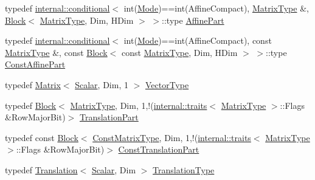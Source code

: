 \begin{DoxyCompactItemize}
\item 
typedef \mbox{\hyperlink{struct_eigen_1_1internal_1_1conditional}{internal\+::conditional}}$<$ int(\mbox{\hyperlink{struct_mode}{Mode}})==int(Affine\+Compact), \mbox{\hyperlink{class_eigen_1_1_transform_a30f72ba46abc2bb3c7fa919c1078fc9c}{Matrix\+Type}} \&, \mbox{\hyperlink{class_eigen_1_1_block}{Block}}$<$ \mbox{\hyperlink{class_eigen_1_1_transform_a30f72ba46abc2bb3c7fa919c1078fc9c}{Matrix\+Type}}, Dim, H\+Dim $>$ $>$\+::type \mbox{\hyperlink{class_eigen_1_1_transform_a8319bad977b0dabf2dfaf2e2dc30f13e}{Affine\+Part}}
\item 
typedef \mbox{\hyperlink{struct_eigen_1_1internal_1_1conditional}{internal\+::conditional}}$<$ int(\mbox{\hyperlink{struct_mode}{Mode}})==int(Affine\+Compact), const \mbox{\hyperlink{class_eigen_1_1_transform_a30f72ba46abc2bb3c7fa919c1078fc9c}{Matrix\+Type}} \&, const \mbox{\hyperlink{class_eigen_1_1_block}{Block}}$<$ const \mbox{\hyperlink{class_eigen_1_1_transform_a30f72ba46abc2bb3c7fa919c1078fc9c}{Matrix\+Type}}, Dim, H\+Dim $>$ $>$\+::type \mbox{\hyperlink{class_eigen_1_1_transform_adfa0bf2d9504548cdc9b9051b2fa9673}{Const\+Affine\+Part}}
\item 
typedef \mbox{\hyperlink{class_eigen_1_1_matrix}{Matrix}}$<$ \mbox{\hyperlink{class_eigen_1_1_transform_a4e69ced9d651745b8ed4eda46f41795d}{Scalar}}, Dim, 1 $>$ \mbox{\hyperlink{class_eigen_1_1_transform_aaeb4ae2f95c8edb0655fd84ab3f89e79}{Vector\+Type}}
\item 
typedef \mbox{\hyperlink{class_eigen_1_1_block}{Block}}$<$ \mbox{\hyperlink{class_eigen_1_1_transform_a30f72ba46abc2bb3c7fa919c1078fc9c}{Matrix\+Type}}, Dim, 1,!(\mbox{\hyperlink{struct_eigen_1_1internal_1_1traits}{internal\+::traits}}$<$ \mbox{\hyperlink{class_eigen_1_1_transform_a30f72ba46abc2bb3c7fa919c1078fc9c}{Matrix\+Type}} $>$\+::Flags \&Row\+Major\+Bit)$>$ \mbox{\hyperlink{class_eigen_1_1_transform_aabeaa2d375bf1b6b1d5cb5d1904fbd06}{Translation\+Part}}
\item 
typedef const \mbox{\hyperlink{class_eigen_1_1_block}{Block}}$<$ \mbox{\hyperlink{class_eigen_1_1_transform_aed436d14b16bd862bac5367990085795}{Const\+Matrix\+Type}}, Dim, 1,!(\mbox{\hyperlink{struct_eigen_1_1internal_1_1traits}{internal\+::traits}}$<$ \mbox{\hyperlink{class_eigen_1_1_transform_a30f72ba46abc2bb3c7fa919c1078fc9c}{Matrix\+Type}} $>$\+::Flags \&Row\+Major\+Bit)$>$ \mbox{\hyperlink{class_eigen_1_1_transform_a3eab3259d3fac8106eb3139bc96ba852}{Const\+Translation\+Part}}
\item 
typedef \mbox{\hyperlink{class_eigen_1_1_translation}{Translation}}$<$ \mbox{\hyperlink{class_eigen_1_1_transform_a4e69ced9d651745b8ed4eda46f41795d}{Scalar}}, Dim $>$ \mbox{\hyperlink{class_eigen_1_1_transform_a6b463d14d8be4c0eda2eed6e943b831f}{Translation\+Type}}

\end{DoxyCompactItemize}
